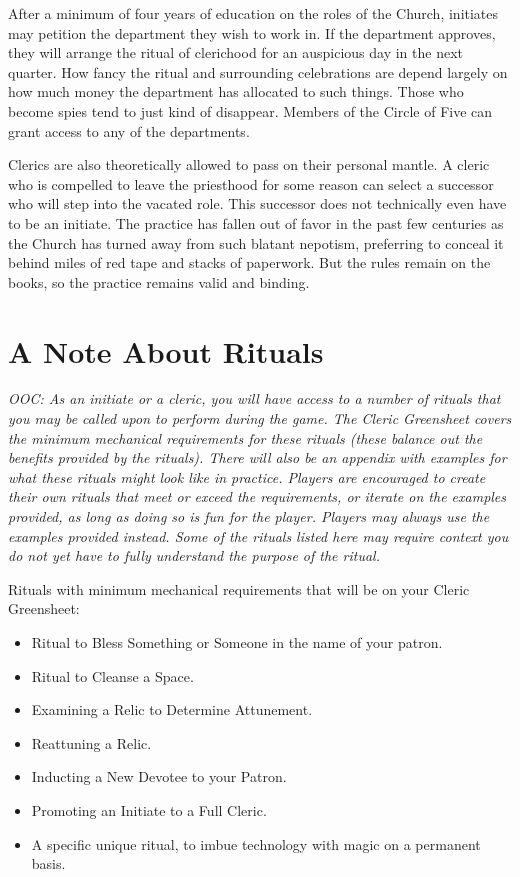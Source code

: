 \documentclass[blue]{GL2020}
\begin{document}
After a minimum of four years of education on the roles of the Church, initiates may petition the department they wish to work in. If the department approves, they will arrange the ritual of clerichood for an auspicious day in the next quarter. How fancy the ritual and surrounding celebrations are depend largely on how much money the department has allocated to such things. Those who become spies tend to just kind of disappear. Members of the Circle of Five can grant access to any of the departments. 

Clerics are also theoretically allowed to pass on their personal mantle. A cleric who is compelled to leave the priesthood for some reason can select a successor who will step into the vacated role. This successor does not technically even have to be an initiate. The practice has fallen out of favor in the past few centuries as the Church has turned away from such blatant nepotism, preferring to conceal it behind miles of red tape and stacks of paperwork. But the rules remain on the books, so the practice remains valid and binding.

\section*{A Note About Rituals}
\emph{OOC: As an initiate or a cleric, you will have access to a number of rituals that you may be called upon to perform during the game. The Cleric Greensheet covers the minimum mechanical requirements for these rituals (these balance out the benefits provided by the rituals). There will also be an appendix with examples for what these rituals might look like in practice. Players are encouraged to create their own rituals that meet or exceed the requirements, or iterate on the examples provided, as long as doing so is fun for the player. Players may always use the examples provided instead. Some of the rituals listed here may require context you do not yet have to fully understand the purpose of the ritual.}

Rituals with minimum mechanical requirements that will be on your Cleric Greensheet:
\begin{itemize}
  \item Ritual to Bless Something or Someone in the name of your patron.
  \item Ritual to Cleanse a Space.
  \item Examining a Relic to Determine Attunement.
  \item Reattuning a Relic.
  \item Inducting a New Devotee to your Patron.
  \item Promoting an Initiate to a Full Cleric.
  \item A \pTech{} specific unique ritual, to imbue technology with magic on a permanent basis.
\end{itemize}
\end{document}
